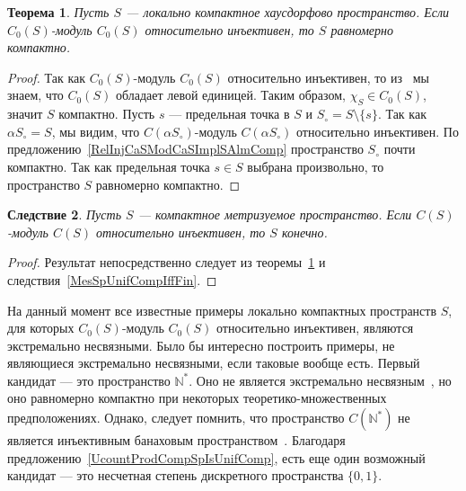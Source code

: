 \documentclass[12pt]{article}
\newtheorem{theorem}{Теорема}[section]
\newtheorem{corollary}[theorem]{Следствие}
\begin{document}
\begin{theorem}\label{RelInjCSModCSImplUnifCompS} Пусть $S$ --- локально
    компактное хаусдорфово пространство. Если $C_0(S)$-модуль $C_0(S)$
    относительно инъективен, то $S$ равномерно компактно.
\end{theorem}
\begin{proof} Так как $C_0(S)$-модуль $C_0(S)$ относительно инъективен, то
    из~\cite[следствие 2.2.8 (i)]{RamsHomPropSemgroupAlg} мы знаем, что $C_0(S)$
    обладает левой единицей. Таким образом, $\chi_S\in C_0(S)$, значит $S$
    компактно. Пусть $s$ --- предельная точка в $S$ и
    $S_\circ=S\setminus \{s\}$. Так как $\alpha S_\circ=S$, мы видим,
    что $C(\alpha S_\circ)$-модуль $C(\alpha S_\circ)$ относительно инъективен.
    По предложению~\ref{RelInjCaSModCaSImplSAlmComp} пространство $S_\circ$
    почти компактно. Так как предельная точка $s\in S$ выбрана произвольно, то
    пространство $S$ равномерно компактно.
\end{proof}

\begin{corollary}\label{CSModCSRelInjImplSHasNoConvSeq} Пусть $S$ --- компактное
    метризуемое пространство. Если $C(S)$-модуль $C(S)$ относительно инъективен,
    то $S$ конечно.
\end{corollary}
\begin{proof}
    Результат непосредственно следует из
    теоремы~\ref{RelInjCSModCSImplUnifCompS} и
    следствия~\ref{MesSpUnifCompIffFin}.
\end{proof}

На данный момент все известные примеры локально компактных пространств $S$, для
которых $C_0(S)$-модуль $C_0(S)$ относительно инъективен, являются экстремально
несвязными. Было бы интересно построить примеры, не являющиеся экстремально
несвязными, если таковые вообще есть. Первый кандидат --- это пространство
$\mathbb{N}^*$. Оно не является экстремально несвязным~\cite[пример
    6.2.31]{EngkingGenTop}, но оно равномерно компактно при некоторых
теоретико-множественных предположениях. Однако, следует помнить, что
пространство $C(\mathbb{N}^*)$ не является инъективным банаховым
пространством~\cite[следствие 2]{AmirProjContFuncSp}. Благодаря
предложению~\ref{UcountProdCompSpIsUnifComp}, есть еще один возможный кандидат
--- это несчетная степень дискретного пространства $\{0, 1\}$.

\end{document}
